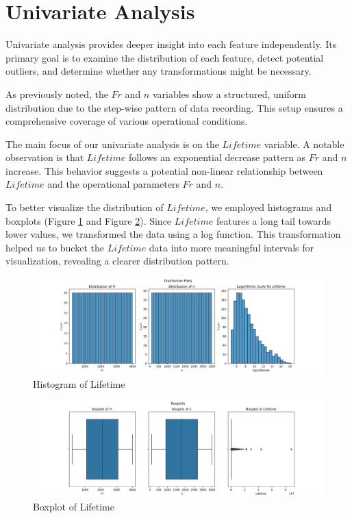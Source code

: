 \section{Univariate Analysis}

Univariate analysis provides deeper insight into each feature independently. Its primary goal is to examine the distribution of each feature, detect potential outliers, and determine whether any transformations might be necessary.

As previously noted, the \(Fr\) and \(n\) variables show a structured, uniform distribution due to the step-wise pattern of data recording. This setup ensures a comprehensive coverage of various operational conditions.

The main focus of our univariate analysis is on the \(Lifetime\) variable. A notable observation is that \(Lifetime\) follows an exponential decrease pattern as \(Fr\) and \(n\) increase. This behavior suggests a potential non-linear relationship between \(Lifetime\) and the operational parameters \(Fr\) and \(n\).

To better visualize the distribution of \(Lifetime\), we employed histograms and boxplots (Figure \ref{fig:bearings-histogram} and Figure \ref{fig:bearings-boxplot}). Since \(Lifetime\) features a long tail towards lower values, we transformed the data using a log function. This transformation helped us to bucket the \(Lifetime\) data into more meaningful intervals for visualization, revealing a clearer distribution pattern.

\begin{figure}[ht]
    \centering
    \includegraphics[width=\textwidth]{assets/bearings-eda/histogram.png}
    \caption{Histogram of Lifetime}
    \label{fig:bearings-histogram}
\end{figure}

\begin{figure}[ht]
    \centering
    \includegraphics[width=\textwidth]{assets/bearings-eda/boxplot.png}
    \caption{Boxplot of Lifetime}
    \label{fig:bearings-boxplot}
\end{figure}

